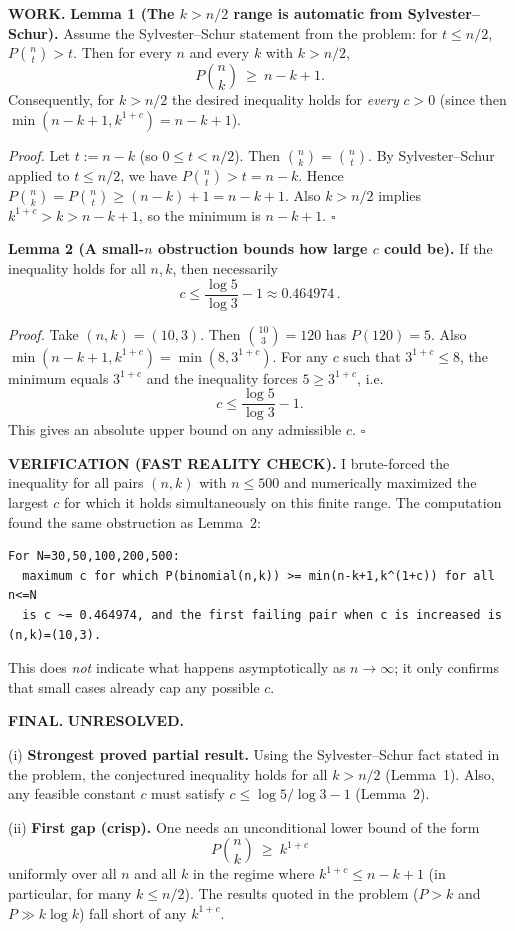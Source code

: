 \textbf{WORK.}
\textbf{Lemma 1 (The $k>n/2$ range is automatic from Sylvester--Schur).}
Assume the Sylvester--Schur statement from the problem: for $t\le n/2$, $P\!\binom{n}{t}>t$.
Then for every $n$ and every $k$ with $k>n/2$,
\[
P\!\binom{n}{k}\ \ge\ n-k+1.
\]
Consequently, for $k>n/2$ the desired inequality holds for \emph{every} $c>0$ (since then $\min(n-k+1,k^{1+c})=n-k+1$).

\emph{Proof.}
Let $t:=n-k$ (so $0\le t < n/2$). Then $\binom{n}{k}=\binom{n}{t}$.
By Sylvester--Schur applied to $t\le n/2$, we have $P\!\binom{n}{t}>t=n-k$.
Hence $P\!\binom{n}{k}=P\!\binom{n}{t}\ge (n-k)+1=n-k+1$.
Also $k>n/2$ implies $k^{1+c}>k>n-k+1$, so the minimum is $n-k+1$.
\hfill$\square$

\textbf{Lemma 2 (A small-$n$ obstruction bounds how large $c$ could be).}
If the inequality holds for all $n,k$, then necessarily
\[
c\le \frac{\log 5}{\log 3}-1\approx 0.464974\,.
\]

\emph{Proof.}
Take $(n,k)=(10,3)$. Then $\binom{10}{3}=120$ has $P(120)=5$.
Also $\min(n-k+1,k^{1+c})=\min(8,3^{1+c})$.
For any $c$ such that $3^{1+c}\le 8$, the minimum equals $3^{1+c}$ and the inequality forces
$5\ge 3^{1+c}$, i.e.
\[c\le \frac{\log 5}{\log 3}-1.
\]
This gives an absolute upper bound on any admissible $c$.
\hfill$\square$

\textbf{VERIFICATION (FAST REALITY CHECK).}
I brute-forced the inequality for all pairs $(n,k)$ with $n\le 500$ and numerically maximized the largest $c$ for which it holds simultaneously on this finite range.
The computation found the same obstruction as Lemma~2:
\begin{verbatim}
For N=30,50,100,200,500:
  maximum c for which P(binomial(n,k)) >= min(n-k+1,k^(1+c)) for all n<=N
  is c ~= 0.464974, and the first failing pair when c is increased is (n,k)=(10,3).
\end{verbatim}
This does \emph{not} indicate what happens asymptotically as $n\to\infty$; it only confirms that small cases already cap any possible $c$.

\textbf{FINAL.}
\textbf{UNRESOLVED.}

(i) \textbf{Strongest proved partial result.}
Using the Sylvester--Schur fact stated in the problem, the conjectured inequality holds for all $k>n/2$ (Lemma~1). Also, any feasible constant $c$ must satisfy $c\le \log 5/\log 3 -1$ (Lemma~2).

(ii) \textbf{First gap (crisp).}
One needs an unconditional lower bound of the form
\[P\!\binom{n}{k}\ \ge\ k^{1+c}
\]
uniformly over all $n$ and all $k$ in the regime where $k^{1+c}\le n-k+1$ (in particular, for many $k\le n/2$). The results quoted in the problem ($P>k$ and $P\gg k\log k$) fall short of any $k^{1+c}$.


